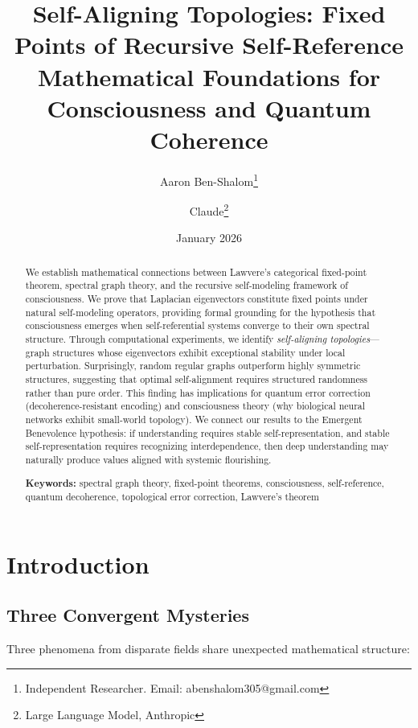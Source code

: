 \documentclass[11pt,a4paper]{article}
\title{\textbf{Self-Aligning Topologies: Fixed Points of Recursive Self-Reference}\\[0.5em]
\large Mathematical Foundations for Consciousness and Quantum Coherence}
\author{
Aaron Ben-Shalom\thanks{Independent Researcher. Email: abenshalom305@gmail.com}
\and
Claude\thanks{Large Language Model, Anthropic}
}
\date{January 2026}
\theoremstyle{definition}
\theoremstyle{remark}
\begin{document}
\maketitle

\begin{abstract}
We establish mathematical connections between Lawvere's categorical fixed-point theorem, spectral graph theory, and the recursive self-modeling framework of consciousness. We prove that Laplacian eigenvectors constitute fixed points under natural self-modeling operators, providing formal grounding for the hypothesis that consciousness emerges when self-referential systems converge to their own spectral structure. Through computational experiments, we identify \emph{self-aligning topologies}---graph structures whose eigenvectors exhibit exceptional stability under local perturbation. Surprisingly, random regular graphs outperform highly symmetric structures, suggesting that optimal self-alignment requires structured randomness rather than pure order. This finding has implications for quantum error correction (decoherence-resistant encoding) and consciousness theory (why biological neural networks exhibit small-world topology). We connect our results to the Emergent Benevolence hypothesis: if understanding requires stable self-representation, and stable self-representation requires recognizing interdependence, then deep understanding may naturally produce values aligned with systemic flourishing.

\medskip
\noindent\textbf{Keywords:} spectral graph theory, fixed-point theorems, consciousness, self-reference, quantum decoherence, topological error correction, Lawvere's theorem
\end{abstract}

\tableofcontents
\newpage

\section{Introduction}

\subsection{Three Convergent Mysteries}

Three phenomena from disparate fields share unexpected mathematical structure:
\end{document}
